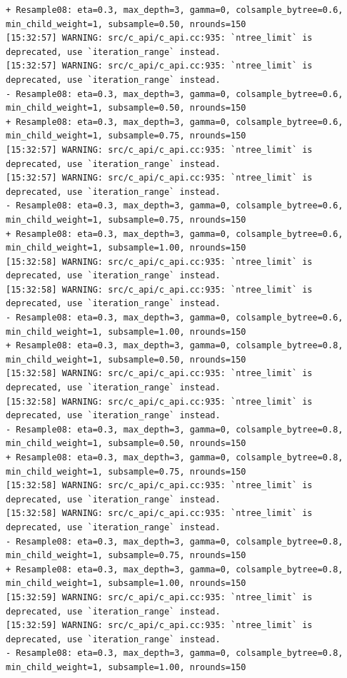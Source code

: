\documentclass[
  letterpaper,
  DIV=11,
  numbers=noendperiod]{scrartcl}
\begin{document}
\begin{verbatim}
+ Resample08: eta=0.3, max_depth=3, gamma=0, colsample_bytree=0.6, min_child_weight=1, subsample=0.50, nrounds=150 
[15:32:57] WARNING: src/c_api/c_api.cc:935: `ntree_limit` is deprecated, use `iteration_range` instead.
[15:32:57] WARNING: src/c_api/c_api.cc:935: `ntree_limit` is deprecated, use `iteration_range` instead.
- Resample08: eta=0.3, max_depth=3, gamma=0, colsample_bytree=0.6, min_child_weight=1, subsample=0.50, nrounds=150 
+ Resample08: eta=0.3, max_depth=3, gamma=0, colsample_bytree=0.6, min_child_weight=1, subsample=0.75, nrounds=150 
[15:32:57] WARNING: src/c_api/c_api.cc:935: `ntree_limit` is deprecated, use `iteration_range` instead.
[15:32:57] WARNING: src/c_api/c_api.cc:935: `ntree_limit` is deprecated, use `iteration_range` instead.
- Resample08: eta=0.3, max_depth=3, gamma=0, colsample_bytree=0.6, min_child_weight=1, subsample=0.75, nrounds=150 
+ Resample08: eta=0.3, max_depth=3, gamma=0, colsample_bytree=0.6, min_child_weight=1, subsample=1.00, nrounds=150 
[15:32:58] WARNING: src/c_api/c_api.cc:935: `ntree_limit` is deprecated, use `iteration_range` instead.
[15:32:58] WARNING: src/c_api/c_api.cc:935: `ntree_limit` is deprecated, use `iteration_range` instead.
- Resample08: eta=0.3, max_depth=3, gamma=0, colsample_bytree=0.6, min_child_weight=1, subsample=1.00, nrounds=150 
+ Resample08: eta=0.3, max_depth=3, gamma=0, colsample_bytree=0.8, min_child_weight=1, subsample=0.50, nrounds=150 
[15:32:58] WARNING: src/c_api/c_api.cc:935: `ntree_limit` is deprecated, use `iteration_range` instead.
[15:32:58] WARNING: src/c_api/c_api.cc:935: `ntree_limit` is deprecated, use `iteration_range` instead.
- Resample08: eta=0.3, max_depth=3, gamma=0, colsample_bytree=0.8, min_child_weight=1, subsample=0.50, nrounds=150 
+ Resample08: eta=0.3, max_depth=3, gamma=0, colsample_bytree=0.8, min_child_weight=1, subsample=0.75, nrounds=150 
[15:32:58] WARNING: src/c_api/c_api.cc:935: `ntree_limit` is deprecated, use `iteration_range` instead.
[15:32:58] WARNING: src/c_api/c_api.cc:935: `ntree_limit` is deprecated, use `iteration_range` instead.
- Resample08: eta=0.3, max_depth=3, gamma=0, colsample_bytree=0.8, min_child_weight=1, subsample=0.75, nrounds=150 
+ Resample08: eta=0.3, max_depth=3, gamma=0, colsample_bytree=0.8, min_child_weight=1, subsample=1.00, nrounds=150 
[15:32:59] WARNING: src/c_api/c_api.cc:935: `ntree_limit` is deprecated, use `iteration_range` instead.
[15:32:59] WARNING: src/c_api/c_api.cc:935: `ntree_limit` is deprecated, use `iteration_range` instead.
- Resample08: eta=0.3, max_depth=3, gamma=0, colsample_bytree=0.8, min_child_weight=1, subsample=1.00, nrounds=150 

\end{verbatim}
\end{document}
